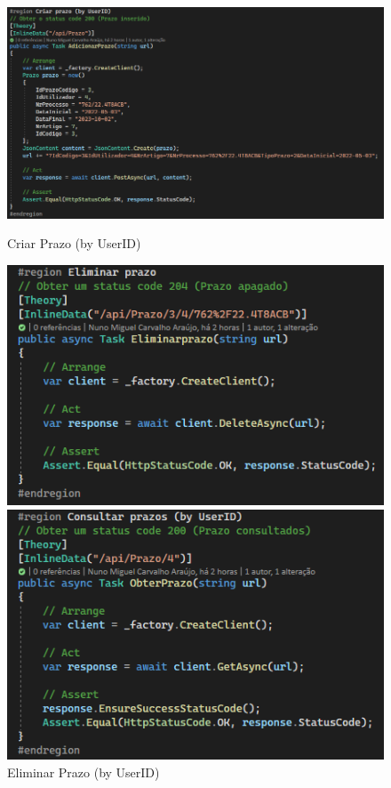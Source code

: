 \begin{figure}[!htbp]
  \centering
  \begin{minipage}[b]{0.4\textwidth}
    \includegraphics[width=\textwidth]{Figuras/TestesUnitarios/Prazo/Criar Prazo.png}
    \caption{Criar Prazo (by UserID)}
    \label{d.unitario}
  \end{minipage}
  \hfill
  \begin{minipage}[b]{0.4\textwidth}
    \includegraphics[width=\textwidth]{Figuras/TestesUnitarios/Prazo/Eliminar Prazo.png}
    \caption{Eliminar Prazo (by UserID)}
    \label{d.unitario}
  \end{minipage}
  \centering
  \begin{minipage}[b]{0.4\textwidth}
    \includegraphics[width=\textwidth]{Figuras/TestesUnitarios/Prazo/Consultar Prazo (by UserID).png}

\end{minipage}
\end{figure}
